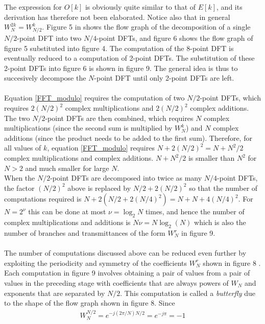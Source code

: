 The expression for $O[k]$ is obviously quite similar to that of $E[k]$, and its derivation has therefore not been elaborated. Notice also that in general $W_N^{2k} = W_{N/2}^k$. Figure 5 in \cite{page 760, DTSP} shows the flow graph of the decomposition of a single $N/2$-point DFT into two $N/4$-point DFTs, and figure 6 shows the flow graph of figure 5 substituted  into figure 4. The computation of the 8-point DFT is eventually reduced to a computation of  2-point DFTs. The substitution of these 2-point DFTs into figure 6 is shown in figure 9. The general idea is thus to succesively decompose the $N$-point DFT until only 2-point DFTs are left. 
\\ \\
Equation \eqref{FFT_modulo} requires the computation of two $N/2$-point DFTs, which requires $2(N/2)^2$ complex multiplications and $2(N/2)^2$ complex additions. The two $N/2$-point DFTs are then combined, which requires $N$ complex multiplications (since the second sum is multiplied by $W_N^k$) and $N$ complex additions (since the product needs to be added to the first sum). Therefore, for all values of $k$, equation \eqref{FFT_modulo} requires $N + 2(N/2)^2 = N + N^2/2$ complex multiplications and complex additions. $N + N^2/2$ is smaller than $N^2$ for $N > 2$ and much smaller for large $N$.
\\
When the $N/2$-point DFTs are decomposed into twice as many $N/4$-point DFTs, the factor $(N/2)^2$ above is replaced by $N/2 + 2(N/2)^2$ so that the number of computations required is $N + 2(N/2+2(N/4)^2) = N + N + 4(N/4)^2$. For $N = 2^\nu$ this can be done at most $\nu = \log_2 N$ times, and hence the number of complex multiplications and additions is $N \nu = N \log_2 (N)$ which is also the number of branches and transmittances of the form $W_N^r$ in figure 9. 
\\ \\
The number of computations discussed above can be reduced even further by exploiting the periodicity and symmetry of the coefficients $W_N^r$ shown in figure 8 \cite{DTSP}. Each computation in figure 9 involves obtaining a pair of values from a pair of values in the preceding stage with coefficients that are always powers of $W_N$ and exponents that are separated by $N/2$. This computation is called a \textit{butterfly} due to the shape of the flow graph shown in figure 8. Since 
\begin{align*}
W_N^{N/2} = e^{-j(2\pi/N)N/2} = e^{-j\pi} = -1
\end{align*}

